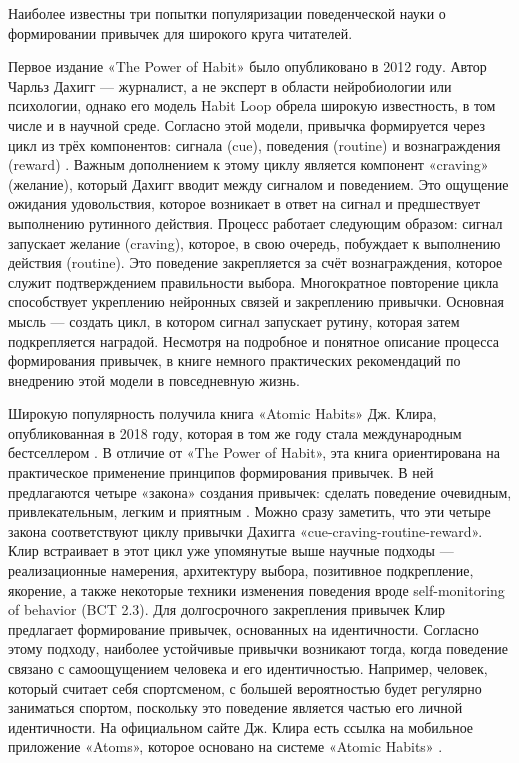 \documentclass[pdflatex,sn-mathphys-num]{sn-jnl}%
\theoremstyle{thmstyleone}%
\theoremstyle{thmstyletwo}%
\theoremstyle{thmstylethree}%
\begin{document}
Наиболее известны три попытки популяризации поведенческой науки о формировании привычек для широкого круга читателей.

Первое издание «The Power of Habit» было опубликовано в 2012 году. Автор Чарльз Дахигг — журналист, а не эксперт в области нейробиологии или психологии, однако его модель Habit Loop обрела широкую известность, в том числе и в научной среде. Согласно этой модели, привычка формируется через цикл из трёх компонентов: сигнала (cue), поведения (routine) и вознаграждения (reward) \cite{duhigg_power_2012}. Важным дополнением к этому циклу является компонент «craving» (желание), который Дахигг вводит между сигналом и поведением. Это ощущение ожидания удовольствия, которое возникает в ответ на сигнал и предшествует выполнению рутинного действия. Процесс работает следующим образом: сигнал запускает желание (craving), которое, в свою очередь, побуждает к выполнению действия (routine). Это поведение закрепляется за счёт вознаграждения, которое служит подтверждением правильности выбора. Многократное повторение цикла способствует укреплению нейронных связей и закреплению привычки. Основная мысль — создать цикл, в котором сигнал запускает рутину, которая затем подкрепляется наградой. Несмотря на подробное и понятное описание процесса формирования привычек, в книге немного практических рекомендаций по внедрению этой модели в повседневную жизнь.

Широкую популярность получила книга «Atomic Habits» Дж. Клира, опубликованная в 2018 году, которая в том же году стала международным бестселлером \cite{noauthor_avery_nodate, editor_james_2022, bureau_james_nodate}. В отличие от «The Power of Habit», эта книга ориентирована на практическое применение принципов формирования привычек. В ней предлагаются четыре «закона» создания привычек: сделать поведение очевидным, привлекательным, легким и приятным \cite{clear_atomic_2018}. Можно сразу заметить, что эти четыре закона соответствуют циклу привычки Дахигга «cue-craving-routine-reward». Клир встраивает в этот цикл уже упомянутые выше научные подходы — реализационные намерения, архитектуру выбора, позитивное подкрепление, якорение, а также некоторые техники изменения поведения вроде self-monitoring of behavior (BCT 2.3). Для долгосрочного закрепления привычек Клир предлагает формирование привычек, основанных на идентичности. Согласно этому подходу, наиболее устойчивые привычки возникают тогда, когда поведение связано с самоощущением человека и его идентичностью. Например, человек, который считает себя спортсменом, с большей вероятностью будет регулярно заниматься спортом, поскольку это поведение является частью его личной идентичности. На официальном сайте Дж. Клира есть ссылка на мобильное приложение «Atoms», которое основано на системе «Atomic Habits» \cite{noauthor_atoms_nodate}.
\end{document}
